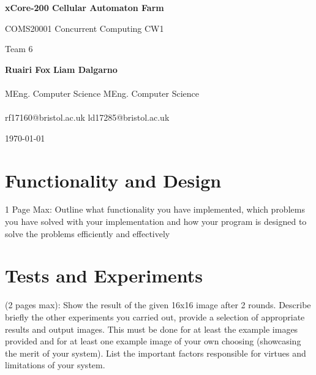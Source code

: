 \documentclass{article}
\begin{document}
    \begin{titlepage}
        \begin{center}
            \vspace*{2cm}
            
            {\huge \textbf{xCore-200 Cellular Automaton Farm}}
            
            \vspace{0.5cm}
            
            {\Large COMS20001 Concurrent Computing CW1}
            
            \vspace{0.5cm}
            
            {\large Team 6}
            
            \vspace{1cm}
            
            \hspace*{1cm} {\Large \textbf{Ruairi Fox}} \hfill {\Large \textbf{Liam Dalgarno}} \hspace*{1cm} \\~\\[-0.5em]
            \hspace*{1cm} MEng. Computer Science \hfill MEng. Computer Science  \hspace*{1cm} \\~\\[-1em]
            \hspace*{1cm} rf17160@bristol.ac.uk  \hfill ld17285@bristol.ac.uk  \hspace*{1cm} 
            
            \vspace{1cm}
            
            {\large \today}
        \end{center}
    \end{titlepage}

    \section{Functionality and Design}
    1 Page Max: Outline what functionality you have implemented, which problems you have solved with your implementation and how your program is designed to solve the problems efficiently and effectively
    \pagebreak

    \section{Tests and Experiments}
    (2 pages max): Show the result of the given 16x16 image after 2 rounds. Describe briefly the other experiments you carried out, provide a selection of appropriate results and output images. This must be done for at least the example images provided and for at least one example image of your own choosing (showcasing the merit of your system). List the important factors responsible for virtues and limitations of your system.
    
\end{document}
